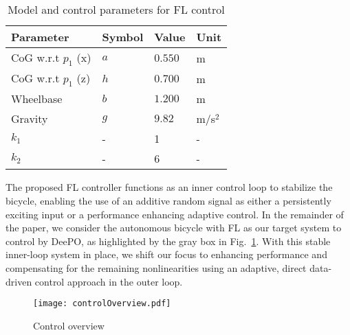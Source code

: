 \begin{table}[b]
\centering
\caption{Model and control parameters for FL control}
\label{tab:modParam}
\begin{tabular}{@{}llll@{}}
\toprule
\textbf{Parameter}  & \textbf{Symbol} & \textbf{Value} & \textbf{Unit} \\ \midrule
CoG w.r.t $p_1$ (x) & $a$             & $0.550$        & m             \\
CoG w.r.t $p_1$ (z) & $h$             & $0.700$        & m             \\
Wheelbase           & $b$             & $1.200$        & m             \\
Gravity             & $g$             & $9.82$         & m/s$^2$       \\
$k_1$               & -               & 1              & -             \\
$k_2$               & -               & 6              & -             \\ \bottomrule
\end{tabular}
\end{table}

The proposed FL controller functions as an inner control loop to stabilize the bicycle, enabling the use of an additive random signal as either a persistently exciting input or a performance enhancing adaptive control. In the remainder of the paper, we consider the autonomous bicycle with FL as our target system to control by DeePO, as highlighted by the gray box in Fig.~\ref{fig:controlOverview}. With this stable inner-loop system in place, we shift our focus to enhancing performance and compensating for the remaining nonlinearities using an adaptive, direct data-driven control approach in the outer loop.
 

\begin{figure}[t]
    \centering
    \texttt{[image: controlOverview.pdf]}
    \caption{Control overview}
    \label{fig:controlOverview}
\end{figure}






